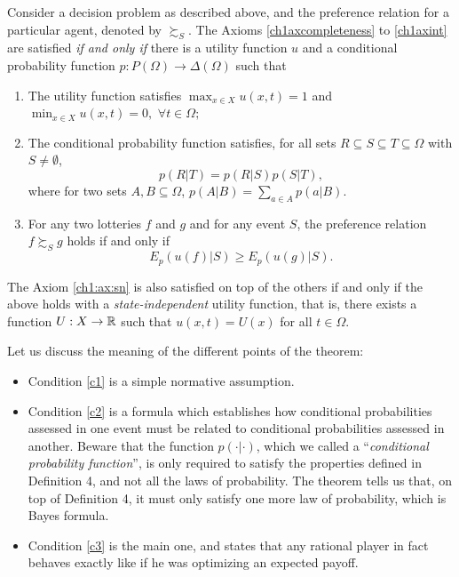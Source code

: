 \begin{theorem}
Consider a decision problem as described above, and the preference relation for a particular agent, denoted by $\succsim_S.$
The Axioms \ref{ch1axcompleteness} to \ref{ch1axint}  are satisfied \emph{if and only if} there is a utility function $u$ and a conditional probability function $p : P(\Omega) \rightarrow  \Delta(\Omega)$ such that
\begin{enumerate}
\item The utility function satisfies $\max_{x \in X} u(x,t) = 1$ and $\min_{x \in X} u(x,t) =0,$  $\forall t \in \Omega;$
\label{c1}
\item The conditional probability function satisfies, for all sets $R \subseteq S \subseteq T \subseteq \Omega$ with $S \neq \emptyset$,
\begin{equation}
p(R|T) = p(R|S)p(S|T),
\label{ch1:eq:probaas}
\end{equation}
where for two sets $A, B \subseteq \Omega$, $p(A|B) = \sum_{a \in A}p(a|B).$
\label{c2}
\item For any two lotteries $f$ and $g$ and for any event $S$, the preference relation $f \succsim_S g$ holds if and only if
$$ E_p(u(f) | S) \geq E_p(u(g) | S).$$
\label{c3}
\end{enumerate}
The Axiom \ref{ch1:ax:sn} is also satisfied on top of the others if and only if the above holds with a \emph{state-independent} utility function, that is,
there exists a function $U : X \rightarrow \mathbb{R}$ such that
$u(x,t) = U(x)$ for all $t \in \Omega$.
\label{ch1:utility-maximization}
\end{theorem}


Let us discuss the meaning of the different points of the theorem:
\begin{itemize}
\item Condition \ref{c1} is a simple normative assumption.
\item Condition \ref{c2} is a formula which establishes how conditional probabilities assessed in one event must be related to conditional probabilities assessed in another. Beware that the function $p(\cdot|\cdot)$, which we called a ``\emph{conditional probability function}'', is  only required to satisfy the properties defined in Definition 4, and not all the laws of probability.  The theorem tells us that, on top of Definition 4, it must only satisfy one more law of probability, which is Bayes formula.
\item Condition \ref{c3} is the main one, and states that any rational player in fact behaves exactly like if he was optimizing an expected payoff.
\end{itemize}

